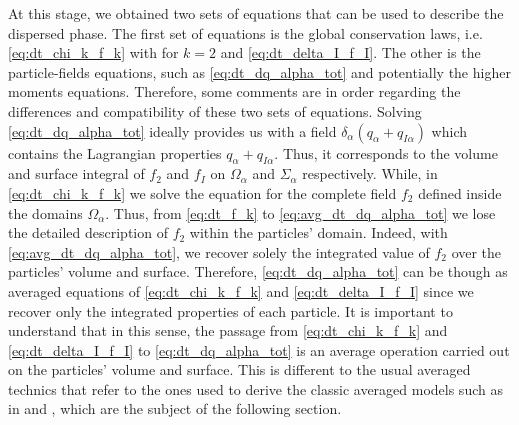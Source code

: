 At this stage, we obtained two sets of equations that can be used to describe the dispersed phase. 
The first set of equations is the global conservation laws, i.e. \ref{eq:dt_chi_k_f_k} with for $k=2$ and \ref{eq:dt_delta_I_f_I}. 
The other is the particle-fields equations, such as \ref{eq:dt_dq_alpha_tot} and potentially the higher moments equations.
Therefore, some comments are in order regarding the differences and compatibility of these two sets of equations.
Solving \ref{eq:dt_dq_alpha_tot} ideally provides us with a field $\delta_\alpha(q_\alpha+q_{I\alpha})$ which contains the Lagrangian properties $q_\alpha+q_{I\alpha}$.
Thus, it corresponds to the volume and surface integral of $f_2$ and $f_I$ on $\Omega_\alpha$ and $\Sigma_\alpha$ respectively.
While, in \ref{eq:dt_chi_k_f_k} we solve the equation for the complete field $f_2$ defined inside the domains $\Omega_\alpha$.  
Thus, from  \ref{eq:dt_f_k} to \ref{eq:avg_dt_dq_alpha_tot} we lose the detailed description of $f_2$ within the particles' domain.
Indeed, with \ref{eq:avg_dt_dq_alpha_tot}, we recover solely the integrated value of $f_2$ over the particles' volume and surface. 
Therefore, \ref{eq:dt_dq_alpha_tot} can be though as averaged equations of \ref{eq:dt_chi_k_f_k} and \ref{eq:dt_delta_I_f_I} since we recover only the integrated properties of each particle. 
It is important to understand that in this sense, the passage from \ref{eq:dt_chi_k_f_k} and \ref{eq:dt_delta_I_f_I} to \ref{eq:dt_dq_alpha_tot} is an average operation carried out on the particles' volume and surface.
This is different to the usual averaged technics that refer to the ones used to derive the classic averaged models such as in \citet{jackson1997locally} and \citet{zhang1994averaged}, which are the subject of the following section. 



